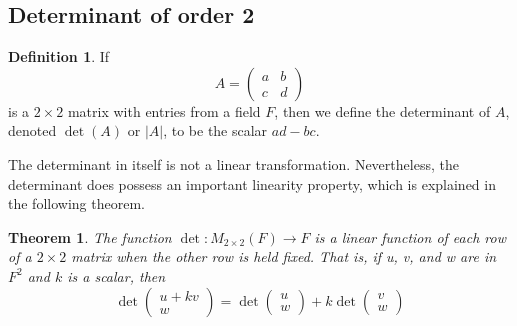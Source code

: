 \documentclass[12pt]{article}
\newtheorem{theorem}{Theorem}[section]
\theoremstyle{definition}
\newtheorem{definition}{Definition}[section]
\theoremstyle{remark}
\begin{document}
\subsection{Determinant of order 2}
\begin{definition}
    If $$A = \begin{pmatrix}
        a&b\\c&d 
    \end{pmatrix}$$
    is a $2 \times 2$ matrix with entries from a field $F$, then we define the determinant of $A$, denoted $\det(A)$ or $|A|$, to be the scalar $ad - bc$.
\end{definition}
The determinant in itself is not a linear transformation. Nevertheless, the determinant does possess 
an important linearity property, which is explained in the following theorem.
\begin{theorem}
    The function $\det: M_{2\times 2} (F) \rightarrow F$ is a linear function of each row of a $2 \times 2$ 
    matrix when the other row is held fixed. That is, if u, v, and w are in $F^2$ and $k$ is a scalar, then
    $$\det \begin{pmatrix}
        u+kv \\ w 
    \end{pmatrix} = \det \begin{pmatrix}
        u \\w 
    \end{pmatrix} + k \det \begin{pmatrix}
        v \\w 
    \end{pmatrix}$$
\end{theorem}
\end{document}
